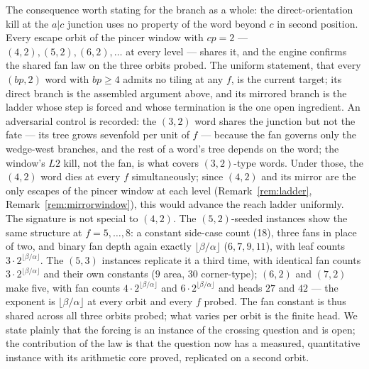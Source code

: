 \documentclass[11pt,reqno]{amsart}
\theoremstyle{plain}
\theoremstyle{definition}
\begin{document}
The consequence worth stating for the branch as a whole: the direct-orientation kill at the
$a|c$ junction uses no property of the word beyond $c$ in second position. Every escape orbit of
the pincer window with $cp=2$ --- $(4,2),(5,2),(6,2),\dots$ at every level --- shares it, and the
engine confirms the shared fan law on the three orbits probed. The uniform statement, that every
$(bp,2)$ word with $bp\ge4$ admits no tiling at any $f$, is the current target; its direct branch
is the assembled argument above, and its mirrored branch is the ladder whose step is forced and
whose termination is the one open ingredient. An adversarial
control is recorded: the $(3,2)$ word shares the junction but not the fate --- its tree grows
sevenfold per unit of $f$ --- because the fan governs only the wedge-west branches, and the rest of
a word's tree depends on the word; the window's $L2$ kill, not the fan, is what covers
$(3,2)$-type words. Under those, the $(4,2)$ word dies at every
$f$ simultaneously; since $(4,2)$ and its mirror are the only escapes of the pincer window at each
level (Remark~\ref{rem:ladder}, Remark~\ref{rem:mirrorwindow}), this would advance the reach
ladder uniformly. The signature is not special to $(4,2)$. The $(5,2)$-seeded instances show the same structure at
$f=5,\dots,8$: a constant side-case count (18), three fans in place of two, and binary fan depth
again exactly $\lfloor\beta/\alpha\rfloor$ ($6,7,9,11$), with leaf counts $3\cdot2^{\lfloor
\beta/\alpha\rfloor}$. The $(5,3)$ instances replicate it a third time, with identical fan counts
$3\cdot2^{\lfloor\beta/\alpha\rfloor}$ and their own constants ($9$ area, $30$ corner-type);
$(6,2)$ and $(7,2)$ make five, with fan counts $4\cdot2^{\lfloor\beta/\alpha\rfloor}$ and
$6\cdot2^{\lfloor\beta/\alpha\rfloor}$ and heads $27$ and $42$ --- the exponent is
$\lfloor\beta/\alpha\rfloor$ at every orbit and every $f$ probed.
The fan constant is thus shared across all three orbits probed; what varies per orbit is the
finite head. We state plainly that the forcing is an instance of the crossing question and is
open; the contribution of the law is that the question now has a measured, quantitative instance
with its arithmetic core proved, replicated on a second orbit.
\end{document}
